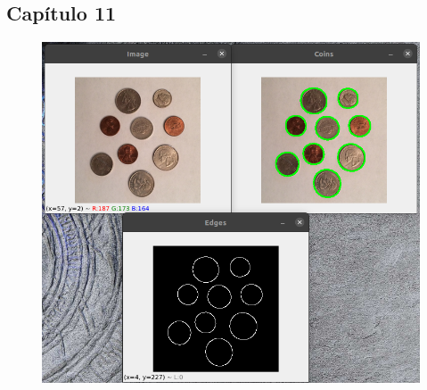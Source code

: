 \documentclass[12pt,letterpaper]{article}
\begin{document}
\begin{multicols}{2}

\section{Capítulo 11}

\begin{figure}[H]
\centering
\includegraphics[width = \columnwidth]{Resultado_ch11.png}
\end{figure} 



\end{multicols}
\balance
\end{document}
